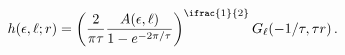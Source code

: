\[\mathop{h\/}\nolimits\!\left(\epsilon,\ell;r\right)=\left(\frac{2}{\pi\tau}%
\frac{A(\epsilon,\ell)}{1-e^{-2\pi/\tau}}\right)^{\ifrac{1}{2}}\mathop{G_{\ell%
}\/}\nolimits\!\left(-1/\tau,\tau r\right).\]